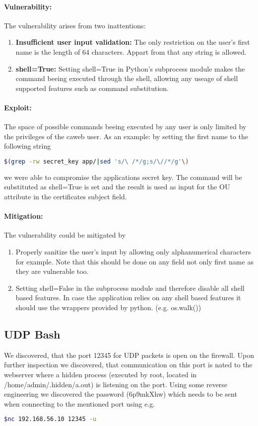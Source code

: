 \documentclass[english]{article}
\begin{document}
 \paragraph{Vulnerability:}
 The vulnerability arises from two inattentions:
\begin{enumerate}
\item \textbf{Insufficient user input validation:} The only restriction on the user's first name is the length of 64 characters. Appart from that any string is allowed.
\item \textbf{shell=True:} Setting shell=True in Python's subprocess module makes the command beeing executed through the shell, allowing any useage of shell supported features such as command substitution. 
\end{enumerate}

\paragraph{Exploit:}
The space of possible commands beeing executed by any user is only limited by the privileges of the caweb user. As an example: by setting the first name to the following string 
\begin{lstlisting}[language=bash]
$(grep -rw secret_key app/|sed 's/\ /*/g;s/\//*/g'\)
\end{lstlisting}
we were able to compromise the applications secret key. The command will be substituted as shell=True is set and the result is used as input for the OU attribute in the certificates subject field.

\paragraph{Mitigation:} The vulnerability could be mitigated by
\begin{enumerate}
\item Properly sanitize the user's input by allowing only alphanumerical characters for example. Note that this should be done on any field not only first name as they are vulnerable too. 
\item Setting shell=False in the subprocess module and therefore disable all shell based features. In case the application relies on any shell based features it should use the wrappers provided by python. (e.g. os.walk())
\end{enumerate}

\subsection{UDP Bash}
We discovered, that the port 12345 for UDP packets is open on the firewall. Upon further inspection we discovered, that communication on this port is nated to the webserver where a hidden process (executed by root, located in /home/admin/.hidden/a.out) is listening on the port. Using some reverse engineering we discovered the password (6p9mkXhw) which needs to be sent when connecting to the mentioned port using e.g.
\begin{lstlisting}[language=bash]
$nc 192.168.56.10 12345 -u
\end{lstlisting}
\end{document}

